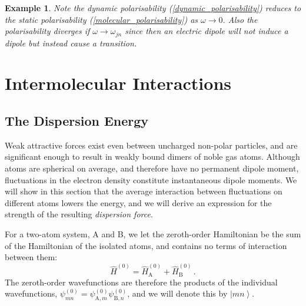 \documentclass{article}
\theoremstyle{plain}\theoremheaderfont{\normalfont\itshape}\theorembodyfont{\rmfamily}\theoremseparator{.}\newtheorem*{rem}{Remark}\newtheorem*{ex}{Example}\newtheorem*{proof}{Proof}\newtheorem*{altp}{Alternative proof}
\theoremstyle{plain}\theoremheaderfont{\normalfont\bfseries}\theorembodyfont{\rmfamily}\theoremseparator{.}\newtheorem{thm}{Theorem}[section]\newtheorem{lem}[thm]{Lemma}\newtheorem{prop}[thm]{Proposition}\newtheorem*{cor}{Corollary}\newtheorem{defn}[thm]{Definition}\newtheorem{clm}[thm]{Claim}\newtheorem{clminproof}{Claim}
\theoremstyle{break}\theoremheaderfont{\normalfont\itshape}\theorembodyfont{\rmfamily}\theoremseparator{.\medskip}\newtheorem*{proofskip}{Proof}\newtheorem*{exs}{Examples}\newtheorem*{rems}{Remarks}
\theoremstyle{break}\theoremheaderfont{\normalfont\bfseries}\theorembodyfont{\rmfamily}\theoremseparator{.\medskip}\newtheorem{lemskip}[thm]{Lemma}\newtheorem{defnskip}[thm]{Definition}\newtheorem{propskip}[thm]{Proposition}\newtheorem{thmskip}[thm]{Theorem}
\numberwithin{equation}{section}
\newcommand{\ket}[1]{\left| #1 \right\rangle}
\renewcommand{\AA}{\mathrm{A}}
\newcommand{\BB}{\mathrm{B}}
\begin{document}
\begin{ex}
        Note the dynamic polarisability (\ref{dynamic_polarisability}) reduces to the static polarisability (\ref{molecular_polarisability}) as \(\omega\to 0\). Also the polarisability diverges if \(\omega\to\omega_{jn}\) since then an electric dipole will not induce a dipole but instead cause a transition.
    \end{ex}

    \newpage
    \section{Intermolecular Interactions}
    \subsection{The Dispersion Energy}
    Weak attractive forces exist even between uncharged non-polar particles, and are significant enough to result in weakly bound dimers of noble gas atoms. Although atoms are spherical on average, and therefore have no permanent dipole moment, fluctuations in the electron density constitute instantaneous dipole moments. We will show in this section that the average interaction between fluctuations on different atoms lowers the energy, and we will derive an expression for the strength of the resulting \textit{dispersion force}.

    For a two-atom system, A and B, we let the zeroth-order Hamiltonian be the sum of the Hamiltonian of the isolated atoms, and contains no terms of interaction between them:
    \begin{equation}
        \hat{H}^{(0)}=\hat{H}_{\AA}^{(0)}+\hat{H}_{\BB}^{(0)}\,.
    \end{equation}
    The zeroth-order wavefunctions are therefore the products of the individual wavefunctions, \(\psi_{mn}^{(0)}=\psi_{\AA,m}^{(0)}\psi_{\BB,n}^{(0)}\), and we will denote this by \(\ket{mn}\).
\end{document}
